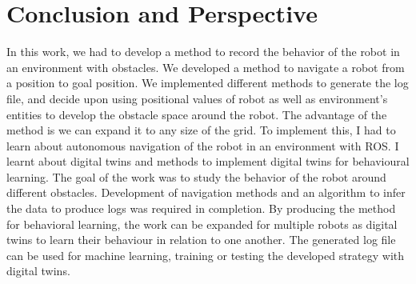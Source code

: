 \section{Conclusion and Perspective}
In this work, we had to develop a method to record the behavior of the robot in an environment with obstacles. We developed a method to navigate a robot from a position to goal position. We implemented different methods to generate the log file, and decide upon using positional values of robot as well as environment's entities to develop the obstacle space around the robot.
The advantage of the method is we can expand it to any size of the grid. To implement this, I had to learn about autonomous navigation of the robot in an environment with ROS. I learnt about digital twins and methods to implement digital twins for behavioural learning. 
The goal of the work was to study the behavior of the robot around different obstacles. Development of navigation methods and an algorithm to infer the data to produce logs was required in completion.
By producing the method for behavioral learning, the work can be expanded for multiple robots as digital twins to learn their behaviour in relation to one another. The generated log file can be used for machine learning, training or testing the developed strategy with digital twins.